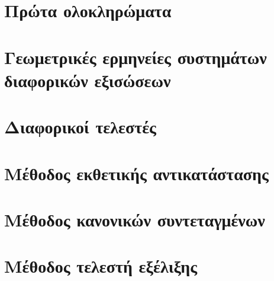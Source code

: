 \documentclass[11pt,a4paper,twoside]{book}
\begin{document}
\section{Πρώτα ολοκληρώματα}
\section{Γεωμετρικές ερμηνείες συστημάτων διαφορικών εξισώσεων}
\section{Διαφορικοί τελεστές}
\section{Μέθοδος εκθετικής αντικατάστασης}
\section{Μέθοδος κανονικών συντεταγμένων}
\section{Μέθοδος τελεστή εξέλιξης}
\end{document}
